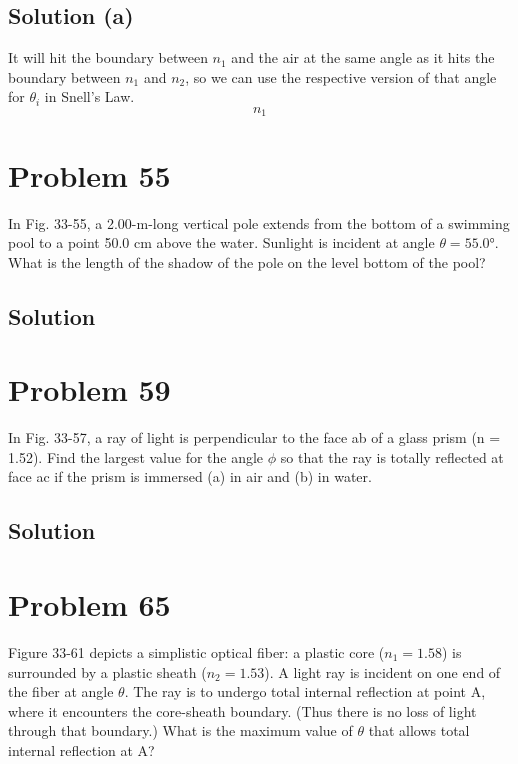 \documentclass[12pt]{article}
\begin{document}
        \subsection{Solution (a)}
            It will hit the boundary between $n_1$ and the air at the same angle as it hits the boundary between $n_1$ and $n_2$, so we can use the respective version of that angle for $\theta_i$ in Snell's Law.
            \begin{equation}
                n_1
            \end{equation}

    \pagebreak
    \section{Problem 55}
        In Fig. 33-55, a 2.00-m-long vertical pole extends from the bottom of a swimming pool to a point 50.0 cm above the water.
        Sunlight is incident at angle $\theta = 55.0\unit{\degree}$. What is the length of the shadow of the pole on the level bottom of the pool?

        \subsection{Solution}

    \pagebreak
    \section{Problem 59}
        In Fig. 33-57, a ray of light is perpendicular to the face ab of a glass prism (n = 1.52).
        Find the largest value for the angle $\phi$ so that the ray is totally reflected at face ac if the prism is immersed (a) in air and (b) in water.

        \subsection{Solution}

    \pagebreak
    \section{Problem 65}
        Figure 33-61 depicts a simplistic optical fiber: a plastic core ($n_1 = 1.58$) is surrounded by a plastic sheath ($n_2 = 1.53$). 
        A light ray is incident on one end of the fiber at angle $\theta$. 
        The ray is to undergo total internal reflection at point A, where it encounters the core-sheath boundary. 
        (Thus there is no loss of light through that boundary.) 
        What is the maximum value of $\theta$ that allows total internal reflection at A?
\end{document}
